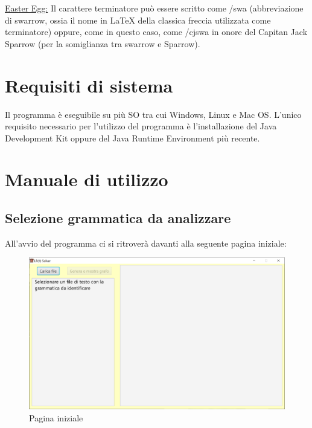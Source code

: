 \documentclass[12pt]{article}
\begin{document}
\underline{Easter Egg:} Il carattere terminatore può essere scritto come /swa (abbreviazione di swarrow, ossia il nome in LaTeX della classica freccia utilizzata come terminatore) oppure, come in questo caso, come /cjswa in onore del Capitan Jack Sparrow (per la somiglianza tra swarrow e Sparrow).


\section{Requisiti di sistema}
Il programma è eseguibile su più SO tra cui Windows, Linux e Mac OS. L'unico requisito necessario per l'utilizzo del programma è l'installazione del Java Development Kit oppure del Java Runtime Environment più recente.

\pagebreak

\section{Manuale di utilizzo}
\subsection{Selezione grammatica da analizzare}
All'avvio del programma ci si ritroverà davanti alla seguente pagina iniziale:
\begin{figure}[h!]
\centering
\includegraphics[scale=0.6]{immagini/Main.png}
\caption{Pagina iniziale}
\end{figure}
\end{document}
